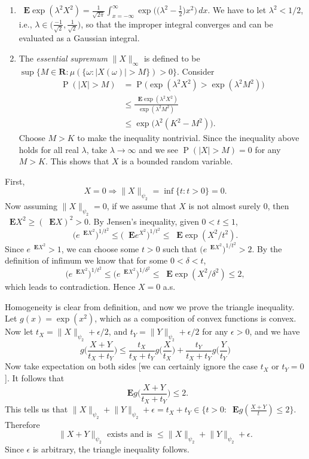 \documentclass[11pt]{article}
\newcommand{\R}{\mathbf{R}}
\newcommand{\nm}[1]{\lVert #1 \rVert}
\newcommand{\abs}[1]{\lvert #1 \rvert}
\renewcommand{\implies}{\Rightarrow}
\renewcommand{\Pr}{\operatorname{P}}
\newcommand{\E}{\mathop{}\!\mathbf{E}}
\newcommand{\df}[1]{\textit{\textsf{#1}}} %
\theoremstyle{plain}
\theoremstyle{definition}
\theoremstyle{remark}
\theoremstyle{definition}
\newenvironment{mansol}[1]{%
  \renewcommand\themansolinner{#1}%
  \mansolinner
}{\endmansolinner}
\begin{document}
\begin{mansol}{2.5.5}
    \begin{enumerate}[label=(\alph*)]
        \item $\E \exp(\lambda^2 X^2) = \frac{1}{\sqrt{2\pi}}\int_{x = -\infty}^\infty \exp\bigl(\bigl(\lambda^2 -\frac 1 2\bigr) x^2\bigr)\,dx$. We have to let $\lambda^2 < 1/2$, i.e., $\lambda \in \bigl(\frac{-1}{\sqrt{2}}, \frac{1}{\sqrt{2}}\bigr)$, so that the improper integral converges and can be evaluated as a Gaussian integral.
        \item The \df{essential supremum} $\nm{X}_\infty$ is defined to be $\sup\{M \in \R : \mu(\{\omega : \abs{X(\omega)} > M\}) > 0\}$. Consider \begin{align*}
            \Pr (\abs{X} > M) & = \Pr\bigl(\exp(\lambda^2 X^2) > \exp(\lambda^2 M^2)\bigr) \\
            & \leq \frac{\E \exp(\lambda^2 X^2)}{\exp(\lambda^2 M^2)} \\
            & \leq \exp\bigl(\lambda^2(K^2 - M^2)\bigr).
        \end{align*}
        Choose $M > K$ to make the inequality nontrivial. Since the inequality above holds for all real $\lambda$, take $\lambda \to \infty$ and we see $\Pr(\abs{X} > M) = 0$ for any $M > K$. This shows that $X$ is a bounded random variable.
    \end{enumerate}
\end{mansol}

\begin{mansol}{2.5.7}
    First, \[X = 0 \implies \nm{X}_{\psi_2} = \inf\{t:t>0\} = 0.\] Now assuming $\nm{X}_{\psi_2} = 0$, if we assume that $X$ is not almost surely 0, then $\E X^2 \geq (\E X)^2 > 0$. By Jensen's inequality, given $0<t\leq 1$, \[
    \bigl(e^{\E X^2}\bigr)^{1/t^2} \leq \bigl(\E e^{X^2}\bigr)^{1/t^2} \leq \E \exp(X^2 / t^2).
    \]
    Since $e^{\E X^2} > 1$, we can choose some $t > 0$ such that $\bigl(e^{\E X^2}\bigr)^{1/t^2} > 2$. By the definition of infimum we know that for some $0 < \delta < t$, \[
         \bigl(e^{\E X^2}\bigr)^{1/t^2} \leq \bigl(e^{\E X^2}\bigr)^{1/\delta^2} \leq \E \exp(X^2 / \delta^2) \leq 2,
    \]
    which leads to contradiction. Hence $X = 0$ a.s.

    Homogeneity is clear from definition, and now we prove the triangle inequality. Let $g(x) = \exp(x^2)$, which as a composition of convex functions is convex. Now let $t_X = \nm{X}_{\psi_2} + \epsilon/2$, and $t_Y = \nm{Y}_{\psi_2} + \epsilon/2$ for any $\epsilon > 0$, and we have \[
        g \biggl(\frac{X+Y}{t_X + t_Y}\biggr) \leq \frac{t_X}{t_X + t_Y} g\biggl(\frac{X}{t_X}\biggr) + \frac{t_Y}{t_X + t_Y} g\biggl(\frac{Y}{t_Y}\biggr)
    \]
    Now take expectation on both sides [we can certainly ignore the case $t_X$ or $t_Y = 0$]. It follows that \[\E g \biggl(\frac{X+Y}{t_X + t_Y}\biggr) \leq 2.\]
    This tells us that $\nm{X}_{\psi_2} + \nm{Y}_{\psi_2} + \epsilon = t_X + t_Y \in \{t>0 : \E g(\frac{X+Y}{t}) \leq 2\}$. Therefore \[
        \nm{X+Y}_{\psi_2} \text{ exists and is } \leq \nm{X}_{\psi_2} + \nm{Y}_{\psi_2} + \epsilon.
    \]
    Since $\epsilon$ is arbitrary, the triangle inequality follows.
\end{mansol}
\end{document}
